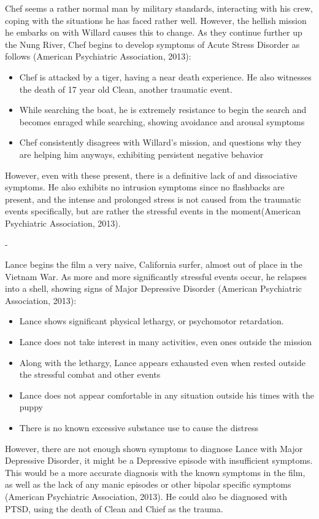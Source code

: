 \documentclass[a4paper,man,natbib]{apa6}
\begin{document}
Chef seems a rather normal man by military standards, interacting with his crew, coping with the situations he has faced rather well. However, the hellish mission he embarks on with Willard causes this to change. As they continue further up the Nung River, Chef begins to develop symptoms of Acute Stress Disorder as follows (American Psychiatric Association, 2013):
\begin{itemize}
\item Chef is attacked by a tiger, having a near death experience. He also witnesses the death of 17 year old Clean, another traumatic event.
\item While searching the boat, he is extremely resistance to begin the search and becomes enraged while searching, showing avoidance and arousal symptoms
\item Chef consistently disagrees with Willard's mission, and questions why they are helping him anyways, exhibiting persistent negative behavior
\end{itemize}
However, even with these present, there is a definitive lack of and dissociative symptoms. He also exhibits no intrusion symptoms since no flashbacks are present, and the intense and prolonged stress is not caused from the traumatic events specifically, but are rather the stressful events in the moment(American Psychiatric Association, 2013).

-

Lance begins the film a very naive, California surfer, almost out of place in the Vietnam War. As more and more significantly stressful events occur, he relapses into a shell, showing signs of Major Depressive Disorder (American Psychiatric Association, 2013):
\begin{itemize}
\item Lance shows significant physical lethargy, or psychomotor retardation.
\item Lance does not take interest in many activities, even ones outside the mission
\item Along with the lethargy, Lance appears exhausted even when rested outside the stressful combat and other events
\item Lance does not appear comfortable in any situation outside his times with the puppy
\item There is no known excessive substance use to cause the distress
\end{itemize}
However, there are not enough shown symptoms to diagnose Lance with Major Depressive Disorder, it might be a Depressive episode with insufficient symptoms. This would be a more accurate diagnosis with the known symptoms in the film, as well as the lack of any manic episodes or other bipolar specific symptoms (American Psychiatric Association, 2013). He could also be diagnosed with PTSD, using the death of Clean and Chief as the trauma.
\end{document}
